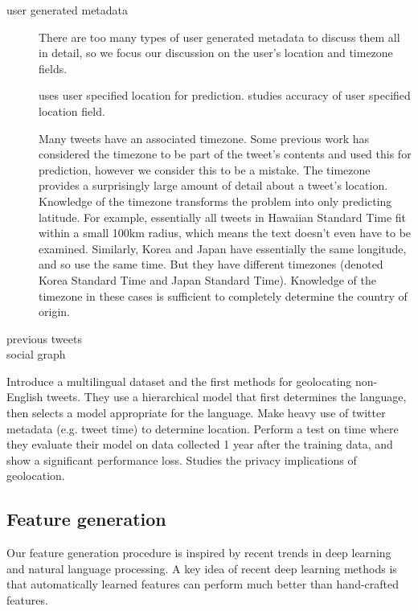 \documentclass[sigconf,10pt]{acmart}
\begin{document}
\begin{description}
    \item[user generated metadata] 
        There are too many types of user generated metadata to discuss them all in detail,
        so we focus our discussion on the user's location and timezone fields.

        \citet{schulz2013multi} uses user specified location for prediction.
        \citet{hecht2011tweets} studies accuracy of user specified location field.

        Many tweets have an associated timezone.
        Some previous work \citep{schulz2013multi,han2014text} has considered the timezone to be part of the tweet's contents and used this for prediction,
        however we consider this to be a mistake.
        The timezone provides a surprisingly large amount of detail about a tweet's location.
        Knowledge of the timezone transforms the problem into only predicting latitude.
        For example, essentially all tweets in Hawaiian Standard Time fit within a small 100km radius, which means the text doesn't even have to be examined.
        Similarly, Korea and Japan have essentially the same longitude, and so use the same time.
        But they have different timezones (denoted Korea Standard Time and Japan Standard Time).
        Knowledge of the timezone in these cases is sufficient to completely determine the country of origin.
        
    \item[previous tweets]
    \item[social graph]
\end{description}

Introduce a multilingual dataset and the first methods for geolocating non-English tweets.
They use a hierarchical model that first determines the language,
then selects a model appropriate for the language.
Make heavy use of twitter metadata (e.g. tweet time) to determine location.
Perform a test on time where they evaluate their model on data collected 1 year after the training data, and show a significant performance loss.
Studies the privacy implications of geolocation.

\subsection{Feature generation}

Our feature generation procedure is inspired by recent trends in deep learning and natural language processing.
A key idea of recent deep learning methods is that automatically learned features can perform much better than hand-crafted features.
\end{document}
